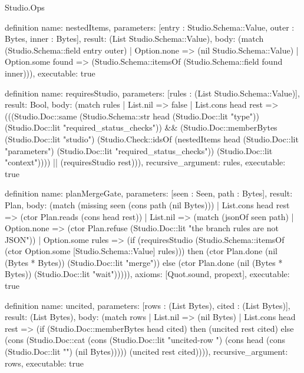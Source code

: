\begin{lexlean}{Studio.Ops}
\begin{semanticmodule}
{definition{
  name: nestedItems,
  parameters: [entry : Studio.Schema::Value, outer : Bytes, inner : Bytes],
  result: (List Studio.Schema::Value),
  body: (match (Studio.Schema::field entry outer)
    | Option.none => (nil Studio.Schema::Value)
    | Option.some found => (Studio.Schema::itemsOf (Studio.Schema::field found inner))),
  executable: true
}

definition{
  name: requiresStudio,
  parameters: [rules : (List Studio.Schema::Value)],
  result: Bool,
  body: (match rules
    | List.nil => false
    | List.cons head rest => (((Studio.Doc::same (Studio.Schema::str head (Studio.Doc::lit "type")) (Studio.Doc::lit "required_status_checks")) && (Studio.Doc::memberBytes (Studio.Doc::lit "studio") (Studio.Check::idsOf (nestedItems head (Studio.Doc::lit "parameters") (Studio.Doc::lit "required_status_checks")) (Studio.Doc::lit "context")))) || (requiresStudio rest))),
  recursive_argument: rules,
  executable: true
}

definition{
  name: planMergeGate,
  parameters: [seen : Seen, path : Bytes],
  result: Plan,
  body: (match (missing seen (cons path (nil Bytes)))
    | List.cons head rest => (ctor Plan.reads (cons head rest))
    | List.nil => (match (jsonOf seen path)
      | Option.none => (ctor Plan.refuse (Studio.Doc::lit "the branch rules are not JSON\n"))
      | Option.some rules => (if (requiresStudio (Studio.Schema::itemsOf (ctor Option.some [Studio.Schema::Value] rules))) then (ctor Plan.done (nil (Bytes * Bytes)) (Studio.Doc::lit "merge\n")) else (ctor Plan.done (nil (Bytes * Bytes)) (Studio.Doc::lit "wait\n"))))),
  axioms: [Quot.sound, propext],
  executable: true
}


definition{
  name: uncited,
  parameters: [rows : (List Bytes), cited : (List Bytes)],
  result: (List Bytes),
  body: (match rows
    | List.nil => (nil Bytes)
    | List.cons head rest => (if (Studio.Doc::memberBytes head cited) then (uncited rest cited) else (cons (Studio.Doc::cat (cons (Studio.Doc::lit "uncited-row ") (cons head (cons (Studio.Doc::lit "\n") (nil Bytes))))) (uncited rest cited)))),
  recursive_argument: rows,
  executable: true
}


}
\end{semanticmodule}
\end{lexlean}
